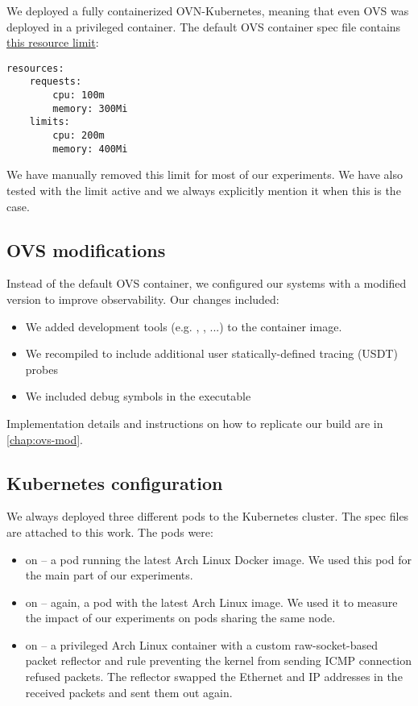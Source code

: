 We deployed a fully containerized OVN-Kubernetes, meaning that even OVS was deployed in a privileged container. The default OVS container spec file contains \href{https://github.com/ovn-org/ovn-kubernetes/blob/master/dist/templates/ovs-node.yaml.j2\#L84-L90}{this resource limit}:

\pagebreak
\begin{verbatim}
resources:
    requests:
        cpu: 100m
        memory: 300Mi
    limits:
        cpu: 200m
        memory: 400Mi
\end{verbatim}

We have manually removed this limit for most of our experiments. We have also tested with the limit active and we always explicitly mention it when this is the case.

\subsection{OVS modifications}

Instead of the default OVS container, we configured our systems with a modified version to improve observability. Our changes included:

\begin{itemize}
    \item We added development tools (e.g. , , ...) to the container image.
    \item We recompiled  to include additional user statically-defined tracing (USDT) \cite{USDT} probes
    \item We included debug symbols in the  executable
\end{itemize}

Implementation details and instructions on how to replicate our build are in \cref{chap:ovs-mod}.

\subsection{Kubernetes configuration}

We always deployed three different pods to the Kubernetes cluster. The spec files are attached to this work. The pods were:

\begin{itemize}
    \item {} on  -- a pod running the latest Arch Linux Docker image. We used this pod for the main part of our experiments.

    \item {} on  -- again, a pod with the latest Arch Linux image. We used it to measure the impact of our experiments on pods sharing the same node.

    \item {} on  -- a privileged Arch Linux container with a custom raw-socket-based packet reflector and  rule preventing the kernel from sending ICMP connection refused packets. The reflector swapped the Ethernet and IP addresses in the received packets and sent them out again.
\end{itemize}

